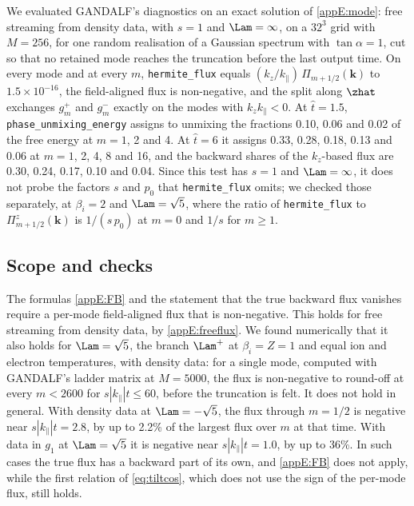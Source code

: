 We evaluated GANDALF's diagnostics on an exact solution of \eqref{appE:mode}: free streaming from density data, with $s=1$ and $\Lam=\infty$, on a $32^3$ grid with $M=256$, for one random realisation of a Gaussian spectrum with $\tan\alpha=1$, cut so that no retained mode reaches the truncation before the last output time. On every mode and at every $m$, \texttt{hermite\_flux} equals $(k_z/k_\parallel)\,\Pi_{m+1/2}(\boldsymbol k)$ to $1.5\times10^{-16}$, the field-aligned flux is non-negative, and the split along $\zhat$ exchanges $g^+_m$ and $g^-_m$ exactly on the modes with $k_zk_\parallel<0$. At $\hat t=1.5$, \texttt{phase\_unmixing\_energy} assigns to unmixing the fractions 0.10, 0.06 and 0.02 of the free energy at $m=1$, 2 and 4. At $\hat t=6$ it assigns 0.33, 0.28, 0.18, 0.13 and 0.06 at $m=1$, 2, 4, 8 and 16, and the backward shares of the $k_z$-based flux are 0.30, 0.24, 0.17, 0.10 and 0.04. Since this test has $s=1$ and $\Lam=\infty$, it does not probe the factors $s$ and $p_0$ that \texttt{hermite\_flux} omits; we checked those separately, at $\beta_i=2$ and $\Lam=\sqrt5$, where the ratio of \texttt{hermite\_flux} to $\Pi^z_{m+1/2}(\boldsymbol k)$ is $1/(s\,p_0)$ at $m=0$ and $1/s$ for $m\ge1$.

\subsection{Scope and checks}\label{appE:sec-checks}

The formulas \eqref{appE:FB} and the statement that the true backward flux vanishes require a per-mode field-aligned flux that is non-negative. This holds for free streaming from density data, by \eqref{appE:freeflux}. We found numerically that it also holds for $\Lam=\sqrt5$, the branch $\Lam^+$ at $\beta_i=Z=1$ and equal ion and electron temperatures, with density data: for a single mode, computed with GANDALF's ladder matrix at $M=5000$, the flux is non-negative to round-off at every $m<2600$ for $s|k_\parallel|t\le60$, before the truncation is felt. It does not hold in general. With density data at $\Lam=-\sqrt5$, the flux through $m=1/2$ is negative near $s|k_\parallel|t=2.8$, by up to 2.2\% of the largest flux over $m$ at that time. With data in $g_1$ at $\Lam=\sqrt5$ it is negative near $s|k_\parallel|t=1.0$, by up to 36\%. In such cases the true flux has a backward part of its own, and \eqref{appE:FB} does not apply, while the first relation of \eqref{eq:tiltcos}, which does not use the sign of the per-mode flux, still holds.

